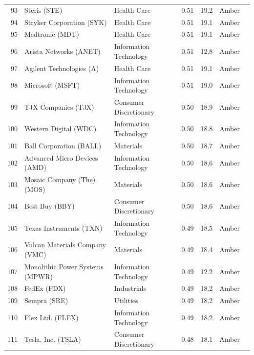 \documentclass[11pt,a4paper]{article}
\begin{document}
{\begin{longtable}{r p{4.4cm} p{2.8cm} r r l l}
93 & Steris (STE) & Health Care & 0.51 & 19.2 & \cellcolor[HTML]{FFEB9C}Amber &  \\
94 & Stryker Corporation (SYK) & Health Care & 0.51 & 19.1 & \cellcolor[HTML]{FFEB9C}Amber &  \\
95 & Medtronic (MDT) & Health Care & 0.51 & 19.1 & \cellcolor[HTML]{FFEB9C}Amber &  \\
96 & Arista Networks (ANET) & Information Technology & 0.51 & 12.8 & \cellcolor[HTML]{FFEB9C}Amber &  \\
97 & Agilent Technologies (A) & Health Care & 0.51 & 19.1 & \cellcolor[HTML]{FFEB9C}Amber &  \\
98 & Microsoft (MSFT) & Information Technology & 0.51 & 19.0 & \cellcolor[HTML]{FFEB9C}Amber &  \\
99 & TJX Companies (TJX) & Consumer Discretionary & 0.50 & 18.9 & \cellcolor[HTML]{FFEB9C}Amber &  \\
100 & Western Digital (WDC) & Information Technology & 0.50 & 18.8 & \cellcolor[HTML]{FFEB9C}Amber &  \\
101 & Ball Corporation (BALL) & Materials & 0.50 & 18.7 & \cellcolor[HTML]{FFEB9C}Amber &  \\
102 & Advanced Micro Devices (AMD) & Information Technology & 0.50 & 18.6 & \cellcolor[HTML]{FFEB9C}Amber &  \\
103 & Mosaic Company (The) (MOS) & Materials & 0.50 & 18.6 & \cellcolor[HTML]{FFEB9C}Amber &  \\
104 & Best Buy (BBY) & Consumer Discretionary & 0.50 & 18.6 & \cellcolor[HTML]{FFEB9C}Amber &  \\
105 & Texas Instruments (TXN) & Information Technology & 0.49 & 18.5 & \cellcolor[HTML]{FFEB9C}Amber &  \\
106 & Vulcan Materials Company (VMC) & Materials & 0.49 & 18.4 & \cellcolor[HTML]{FFEB9C}Amber &  \\
107 & Monolithic Power Systems (MPWR) & Information Technology & 0.49 & 12.2 & \cellcolor[HTML]{FFEB9C}Amber &  \\
108 & FedEx (FDX) & Industrials & 0.49 & 18.2 & \cellcolor[HTML]{FFEB9C}Amber &  \\
109 & Sempra (SRE) & Utilities & 0.49 & 18.2 & \cellcolor[HTML]{FFEB9C}Amber &  \\
110 & Flex Ltd. (FLEX) & Information Technology & 0.49 & 18.2 & \cellcolor[HTML]{FFEB9C}Amber &  \\
111 & Tesla, Inc. (TSLA) & Consumer Discretionary & 0.48 & 18.1 & \cellcolor[HTML]{FFEB9C}Amber &  \\

\end{longtable}}
\end{document}
